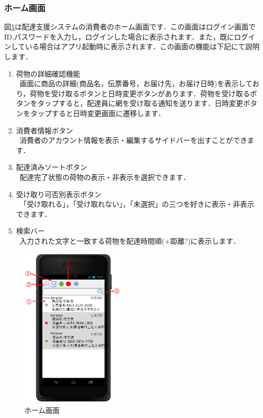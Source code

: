 \documentclass[a4j,titlepage]{jarticle}
\begin{document}
\subsubsection{ホーム画面}
図\ref{fig:user_home}は配達支援システムの消費者のホーム画面です．この画面はログイン画面でID,パスワードを入力し，ログインした場合に表示されます．また，既にログインしている場合はアプリ起動時に表示されます．この画面の機能は下記にて説明します．
\begin{enumerate}
	\item 荷物の詳細確認機能\\
	 \ 画面に商品の詳細(商品名，伝票番号，お届け先，お届け日時)を表示しており，荷物を受け取るボタンと日時変更ボタンがあります．荷物を受け取るボタンをタップすると，配達員に網を受け取る通知を送ります．日時変更ボタンをタップすると日時変更画面に遷移します．
	\item 消費者情報ボタン\\
	 \ 消費者のアカウント情報を表示・編集するサイドバーを出すことができます．

	\item 配達済みソートボタン\\
   \ 配達完了状態の荷物の表示・非表示を選択できます．

	\item 受け取り可否別表示ボタン\\
	 \ 「受け取れる」，「受け取れない」，「未選択」の三つを好きに表示・非表示できます．

	\item 検索バー\\
	 \ 入力された文字と一致する荷物を配達時間順(+距離?)に表示します．

\end{enumerate}

\begin{figure}[H]
 \begin{center}
  \includegraphics[width=50mm]{user_home.png}
	\caption{ホーム画面}
	\label{fig:user_home}
 \end{center}

\end{figure}
\newpage
\end{document}
